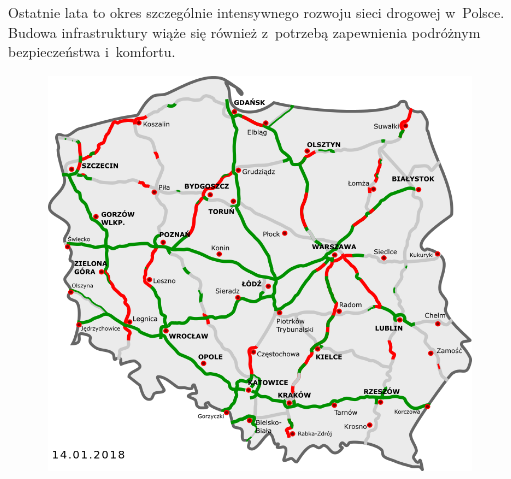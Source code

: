 Ostatnie lata to okres szczególnie intensywnego rozwoju sieci drogowej w~Polsce. Budowa infrastruktury wiąże się również z~potrzebą zapewnienia podróżnym bezpieczeństwa i~komfortu.
\begin{figure}[h]
\includegraphics[width=\textwidth]{images/2018.png}
\end{figure}

